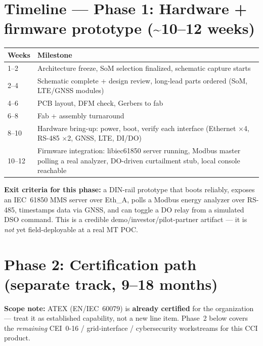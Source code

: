 \documentclass[11pt,a4paper]{article}
\begin{document}
\section{Timeline --- Phase 1: Hardware + firmware prototype (\textasciitilde{}10--12 weeks)}

\begin{tabularx}{\linewidth}{@{}lX@{}}
\toprule
\textbf{Weeks} & \textbf{Milestone} \\
\midrule
1--2 & Architecture freeze, SoM selection finalized, schematic capture starts \\
2--4 & Schematic complete + design review, long-lead parts ordered (SoM, LTE/GNSS modules) \\
4--6 & PCB layout, DFM check, Gerbers to fab \\
6--8 & Fab + assembly turnaround \\
8--10 & Hardware bring-up: power, boot, verify each interface (Ethernet $\times$4, RS-485 $\times$2, GNSS, LTE, DI/DO) \\
10--12 & Firmware integration: libiec61850 server running, Modbus master polling a real analyzer, DO-driven curtailment stub, local console reachable \\
\bottomrule
\end{tabularx}

\vspace{0.75em}
\noindent
\textbf{Exit criteria for this phase:} a DIN-rail prototype that boots reliably, exposes an IEC~61850 MMS server over Eth\_A,
polls a Modbus energy analyzer over RS-485, timestamps data via GNSS, and can toggle a DO relay from a simulated DSO command.
This is a credible demo/investor/pilot-partner artifact --- it is \emph{not} yet field-deployable at a real MT POC.

\section{Phase 2: Certification path (separate track, 9--18 months)}
\label{sec:cert}

\noindent
\textbf{Scope note:} ATEX (EN/IEC~60079) is \textbf{already certified} for the organization --- treat it as established capability, not a new line item.
Phase~2 below covers the \emph{remaining} CEI~0-16 / grid-interface / cybersecurity workstreams for this CCI product.
\end{document}
